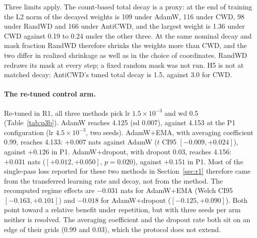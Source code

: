 \documentclass[twoside,11pt]{article}
\begin{document}
Three limits apply. The count-based total decay is a proxy: at the end of training the L2 norm of the decayed weights is 109 under AdamW, 116 under CWD, 98 under RandWD and 166 under AntiCWD, and the largest weight is 1.36 under CWD against 0.19 to 0.24 under the other three. At the same nominal decay and mask fraction RandWD therefore shrinks the weights more than CWD, and the two differ in realized shrinkage as well as in the choice of coordinates. RandWD redraws its mask at every step; a fixed random mask was not run. H5 is not at matched decay: AntiCWD's tuned total decay is 1.5, against 3.0 for CWD.

\begin{table}[t]
\centering
\footnotesize
\resizebox{\textwidth}{!}{}
\caption{Protocol P3, part B: AdamW, AdamW+EMA and AdamW+dropout re-tuned in arm R1 at XS, final seeds 1001--1003. Contrasts are method $-$ AdamW in nats, paired over seeds. The R16 contrast is the registered P1 result on the same seeds. The regime effect is the R16 contrast minus the R1 contrast, with a Welch $t$ CI95 because the two arms are independent runs. The last column is the P1 R1 contrast at the transferred hyperparameters (two seeds).}
\label{tab:p3b}
\end{table}

\paragraph{The re-tuned control arm.} Re-tuned in R1, all three methods pick lr $1.5\times10^{-3}$ and wd 0.5 (Table~\ref{tab:p3b}). AdamW reaches 4.125 (sd 0.007), against 4.153 at the P1 configuration (lr $4.5\times10^{-3}$, two seeds). AdamW+EMA, with averaging coefficient 0.99, reaches 4.133: $+0.007$ nats against AdamW ($t$ CI95 $[-0.009, +0.024]$), against $+0.126$ in P1. AdamW+dropout, with dropout 0.03, reaches 4.156: $+0.031$ nats ($[+0.012, +0.050]$, $p = 0.020$), against $+0.151$ in P1. Most of the single-pass loss reported for these two methods in Section~\ref{sec:r1} therefore came from the transferred learning rate and decay, not from the method. The recomputed regime effects are $-0.031$ nats for AdamW+EMA (Welch CI95 $[-0.163, +0.101]$) and $-0.018$ for AdamW+dropout ($[-0.125, +0.090]$). Both point toward a relative benefit under repetition, but with three seeds per arm neither is resolved. The averaging coefficient and the dropout rate both sit on an edge of their grids (0.99 and 0.03), which the protocol does not extend.
\end{document}
